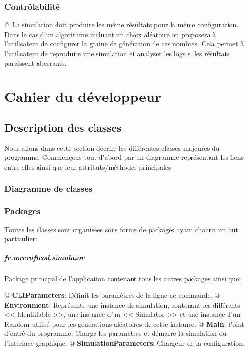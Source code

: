 \documentclass[final]{polytech/polytech}
\begin{document}
		\subsection{Contrôlabilité}
			\begin{easylist}
				@ La simulation doit produire les même résultats pour la même configuration.
				Dans le cas d'un algorithme incluant un choix aléatoire on proposera à l'utilisateur de configurer la graine de génération de ces nombres.
				Cela permet à l'utilisateur de reproduire une simulation et analyser les logs si les résultats paraissent aberrants.
			\end{easylist}
					
\chapter{Cahier du développeur}
	\section{Description des classes}
		Nous allons dans cette section décrire les différentes classes majeures du programme.
		Commençons tout d'abord par un diagramme représentant les liens entre-elles ainsi que leur attributs/méthodes principales.
		
		\subsection{Diagramme de classes}
			
		\subsection{Packages}
			Toutes les classes sont organisées sous forme de packages ayant chacun un but particulier:
			
			\paragraph{fr.mrcraftcod.simulator}
				Package principal de l'application contenant tous les autres packages ainsi que:
				\begin{easylist}
					@ \textbf{CLIParameters}: Définit les paramètres de la ligne de commande.
					@ \textbf{Environment}: Représente une instance de simulation, contenant les différents << Identifiable >>, une instance d'un << Simulator >> et une instance d'un Random utilisé pour les générations aléatoires de cette instance.
					@ \textbf{Main}: Point d'entré du programme. Charge les paramètres et démarre la simulation ou l'interface graphique.
					@ \textbf{SimulationParameters}: Chargeur de la configuration.
				\end{easylist}
		
\end{document}
